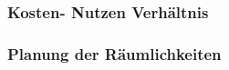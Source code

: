 \chapter{}
\label{sec:overview}

\subsection{Kosten- Nutzen Verhältnis}


\subsection{Planung der Räumlichkeiten}






